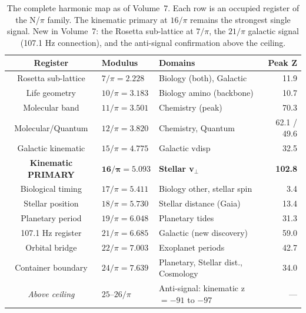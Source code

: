 \documentclass[11pt, letterpaper, openany]{book}
\begin{document}
\begin{table}[H]
\centering
\renewcommand{\arraystretch}{1.5}
\begin{tabular}{|c|l|l|r|}
\hline
\rowcolor{kishblue!10}
\textbf{Register} & \textbf{Modulus} & \textbf{Domains} & \textbf{Peak Z} \\
\hline\hline
Rosetta sub-lattice & $7/\pi = 2.228$ & Biology (both), Galactic & 11.9 \\
Life geometry       & $10/\pi = 3.183$ & Biology amino (backbone) & 10.7 \\
Molecular band      & $11/\pi = 3.501$ & Chemistry (peak)         & 70.3 \\
Molecular/Quantum   & $12/\pi = 3.820$ & Chemistry, Quantum       & 62.1 / 49.6 \\
Galactic kinematic  & $15/\pi = 4.775$ & Galactic vdisp           & 32.5 \\
\textbf{Kinematic PRIMARY} & $\mathbf{16/\pi = 5.093}$ & \textbf{Stellar v$_\perp$} & \textbf{102.8} \\
Biological timing   & $17/\pi = 5.411$ & Biology other, stellar spin & 3.4 \\
Stellar position    & $18/\pi = 5.730$ & Stellar distance (Gaia)  & 13.4 \\
Planetary period    & $19/\pi = 6.048$ & Planetary tides           & 31.3 \\
107.1 Hz register   & $21/\pi = 6.685$ & Galactic (new discovery)  & 59.0 \\
Orbital bridge      & $22/\pi = 7.003$ & Exoplanet periods         & 42.7 \\
Container boundary  & $24/\pi = 7.639$ & Planetary, Stellar dist., Cosmology & 34.0 \\
\hline
\rowcolor{signalred!10}
\textit{Above ceiling} & $25$--$26/\pi$ & Anti-signal: kinematic z $= -91$ to $-97$ & — \\
\hline
\end{tabular}
\caption{The complete harmonic map as of Volume~7. Each row is an occupied register
of the N/$\pi$ family. The kinematic primary at $16/\pi$ remains the strongest single
signal. New in Volume~7: the Rosetta sub-lattice at $7/\pi$, the $21/\pi$ galactic
signal (107.1 Hz connection), and the anti-signal confirmation above the ceiling.}
\label{tab:complete_harmonic_map}
\end{table}
\end{document}
